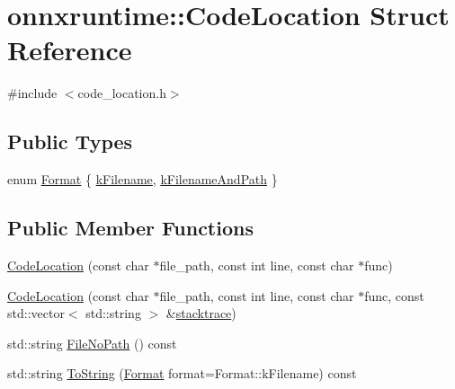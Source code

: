 \hypertarget{structonnxruntime_1_1CodeLocation}{}\section{onnxruntime\+:\+:Code\+Location Struct Reference}
\label{structonnxruntime_1_1CodeLocation}


{\ttfamily \#include $<$code\+\_\+location.\+h$>$}

\subsection*{Public Types}
\begin{DoxyCompactItemize}
\item 
enum \mbox{\hyperlink{structonnxruntime_1_1CodeLocation_a3fb5bf51b3528e696939e0c2daac28d5}{Format}} \{ \mbox{\hyperlink{structonnxruntime_1_1CodeLocation_a3fb5bf51b3528e696939e0c2daac28d5a85483211574729523f5ee4d9ea817a6e}{k\+Filename}}, 
\mbox{\hyperlink{structonnxruntime_1_1CodeLocation_a3fb5bf51b3528e696939e0c2daac28d5a8ade6d8ec5dcdb8e23526a0b4a2fbd2c}{k\+Filename\+And\+Path}}
 \}
\end{DoxyCompactItemize}
\subsection*{Public Member Functions}
\begin{DoxyCompactItemize}
\item 
\mbox{\hyperlink{structonnxruntime_1_1CodeLocation_a416f2ba7671440222dbf6e9d9f73a0a2}{Code\+Location}} (const char $\ast$file\+\_\+path, const int line, const char $\ast$func)
\item 
\mbox{\hyperlink{structonnxruntime_1_1CodeLocation_ade1c131ca45857a21529cc43f2bb8e69}{Code\+Location}} (const char $\ast$file\+\_\+path, const int line, const char $\ast$func, const std\+::vector$<$ std\+::string $>$ \&\mbox{\hyperlink{structonnxruntime_1_1CodeLocation_a51bb351d8b54b29b60dc090a690fc43b}{stacktrace}})
\item 
std\+::string \mbox{\hyperlink{structonnxruntime_1_1CodeLocation_a9b3534852c673b2206e6615cdee8d088}{File\+No\+Path}} () const
\item 
std\+::string \mbox{\hyperlink{structonnxruntime_1_1CodeLocation_ae4effa4d5b551364e9e7255798df3a2d}{To\+String}} (\mbox{\hyperlink{structonnxruntime_1_1CodeLocation_a3fb5bf51b3528e696939e0c2daac28d5}{Format}} format=Format\+::k\+Filename) const
\end{DoxyCompactItemize}
